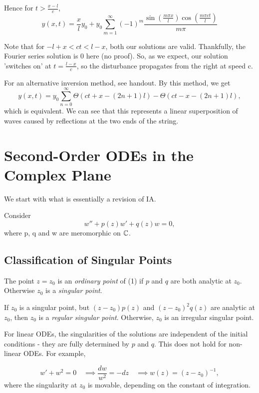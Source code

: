 \documentclass[a4paper]{article}
\begin{document}
\begin{eg}
Hence for $t > \frac{x-l}{c}$,
\[
	y(x,t) = \frac{x}{l}y_0 + y_0 \sum_{m=1}^{\infty}(-1)^{m} \frac{\sin \left( \frac{m \pi x}{l} \right) \cos\left( \frac{m\pi ct}{l} \right)  }{m \pi}
\] 

Note that for $-l + x < ct < l-x$, both our solutions are valid. Thankfully, the Fourier series solution is $0$ here (no proof). So, as we expect, our solution 'switches on' at $t=\frac{l-x}{c}$, so the disturbance propagates from the right at speed c.
\end{eg}

\begin{remark}
	For an alternative inversion method, see handout. By this method, we get
	\[
		y(x,t) = y_0 \sum_{n=0}^{\infty} \Theta(ct + x - (2n+1)l) - \Theta(ct - x - (2n+1)l)
	,\] which is equivalent. We can see that this represents a linear superposition of waves caused by reflections at the two ends of the string. 
\end{remark}

\section{Second-Order ODEs in the Complex Plane}

We start with what is essentially a revision of IA.

Consider 
\[
	w'' + p(z)w' + q(z)w = 0 \tag{1}
,\] where p, q and w are meromorphic on $\mathbb{C}$. 

\subsection{Classification of Singular Points}

\begin{defn}
	The point $z=z_0$ is an \textit{ordinary point} of (1) if $p$ and $q$ are both analytic at $z_0$. Otherwise $z_0$ is a \textit{singular point}.

	If $z_0$ is a singular point, but $(z-z_0)p(z)$ and $(z-z_0)^2q(z)$ are analytic at $z_0$, then $z_0$ is a \textit{regular singular point}. Otherwise, $z_0$ is an irregular singular point.
\end{defn}

For linear ODEs, the singularities of the solutions are independent of the initial conditions - they are fully determined by $p$ and $q$. This does not hold for non-linear ODEs. For example,

\[
	w' + w^2 = 0 \quad \implies \frac{dw}{w^2} = -dz \quad \implies w(z) = (z-z_0)^{-1}
,\] where the singularity at $z_0$ is movable, depending on the constant of integration.
\end{document}
